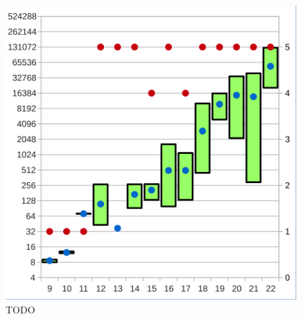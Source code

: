 \begin{figure}[!h]
\begin{minipage}[c]{0.45\textwidth}
  \includegraphics[scale=0.55]{images/data_final_xor}
  \end{minipage}
  \caption{TODO}
  \label{fig:data_final}
\end{figure}